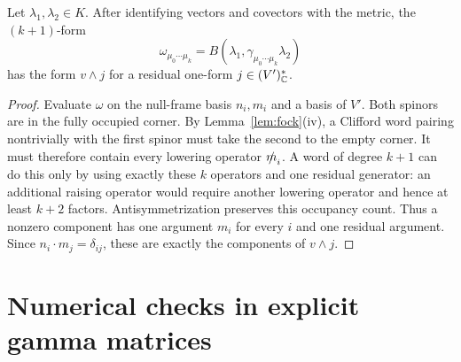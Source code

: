 \begin{lemma}\label{lem:nullcurrent}
Let $\lambda_1,\lambda_2\in K$. After identifying vectors and covectors with the metric, the $(k+1)$-form
\[
 \omega_{\mu_0\cdots\mu_k}
   =B(\lambda_1,\gamma_{\mu_0\cdots\mu_k}\lambda_2)
\]
has the form $v\wedge j$ for a residual one-form $j\in(V')^*_{\mathbb{C}}$.
\end{lemma}
\begin{proof}
Evaluate $\omega$ on the null-frame basis $n_i,m_i$ and a basis of $V'$. Both spinors are in the fully occupied corner. By Lemma~\ref{lem:fock}(iv), a Clifford word pairing nontrivially with the first spinor must take the second to the empty corner. It must therefore contain every lowering operator $\slashed{m}_i$. A word of degree $k+1$ can do this only by using exactly these $k$ operators and one residual generator: an additional raising operator would require another lowering operator and hence at least $k+2$ factors. Antisymmetrization preserves this occupancy count. Thus a nonzero component has one argument $m_i$ for every $i$ and one residual argument. Since $n_i\cdot m_j=\delta_{ij}$, these are exactly the components of $v\wedge j$.
\end{proof}

\section{Numerical checks in explicit gamma matrices}
\label{app:checks}

